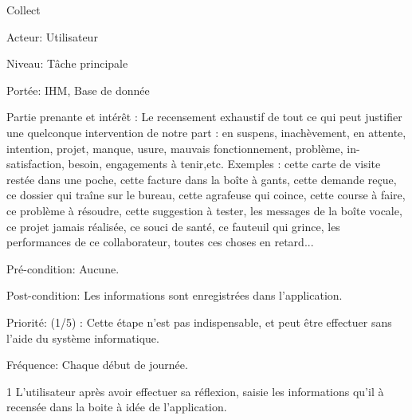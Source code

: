 \begin{usecase}{Collect}

\begin{information}
\item[Acteur:] Utilisateur
\item[Niveau:] Tâche principale
\item[Portée:] IHM, Base de donnée
\item[Partie prenante et intérêt :]
	Le recensement exhaustif de tout ce qui peut justifier une quelconque intervention de notre part : en suspens, inachèvement, en attente, intention, projet, manque, usure, mauvais fonctionnement, problème, in- satisfaction, besoin, engagements à tenir,etc.
Exemples : cette carte de visite restée dans une poche, cette facture dans la boîte à gants, cette demande reçue, ce dossier qui traîne sur le bureau, cette agrafeuse qui coince, cette course à faire, ce problème à résoudre, cette suggestion à tester, les messages de la boîte vocale, ce projet jamais réalisée, ce souci de santé, ce fauteuil qui grince, les performances de ce collaborateur, toutes ces choses en retard...
\item[Pré-condition:] Aucune. 
\item[Post-condition:] Les informations sont enregistrées dans l'application.
\item[Priorité:] (1/5) : Cette étape n'est pas indispensable, et peut être effectuer sans l'aide du système informatique.
\item[Fréquence:] Chaque début de journée.
\end{information}	

\begin{scenario}
\item[1] L'utilisateur après avoir effectuer sa réflexion, saisie les informations qu'il à recensée dans la boite à idée de l'application.
\end{scenario}

	
\end{usecase}


